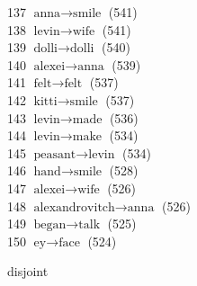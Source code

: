 \begin{appendices}
   137  $ \text{anna} \to \text{smile} $ (541) \\
   138  $ \text{levin} \to \text{wife} $ (541) \\
   139  $ \text{dolli} \to \text{dolli} $ (540) \\
   140  $ \text{alexei} \to \text{anna} $ (539) \\
   141  $ \text{felt} \to \text{felt} $ (537) \\
   142  $ \text{kitti} \to \text{smile} $ (537) \\
   143  $ \text{levin} \to \text{made} $ (536) \\
   144  $ \text{levin} \to \text{make} $ (534) \\
   145  $ \text{peasant} \to \text{levin} $ (534) \\
   146  $ \text{hand} \to \text{smile} $ (528) \\
   147  $ \text{alexei} \to \text{wife} $ (526) \\
   148  $ \text{alexandrovitch} \to \text{anna} $ (526) \\
   149  $ \text{began} \to \text{talk} $ (525) \\
   150  $ \text{ey} \to \text{face} $ (524)

disjoint


\end{appendices}
